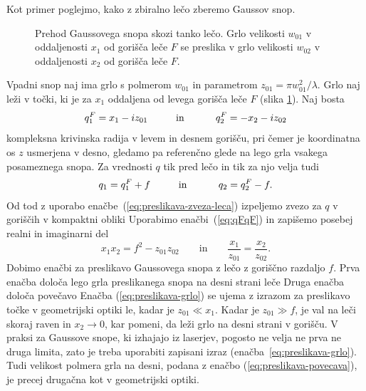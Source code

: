 Kot primer poglejmo, kako z zbiralno lečo zberemo Gaussov snop.
\begin{figure}[h]
\centering
\def\svgwidth{140truemm} 

\caption{Prehod Gaussovega snopa skozi
tanko lečo. Grlo velikosti $w_{01}$ v oddaljenosti $x_{1}$ od gorišča
leče $F$ se preslika v grlo velikosti $w_{02}$ v oddaljenosti $x_{2}$ od gorišča
leče $F$.}
\label{fig:Prehod-Gaussovega-snopa}
\end{figure}

Vpadni snop naj ima grlo s polmerom $w_{01}$ in parametrom $z_{01}=\pi w_{01}^2/\lambda$. 
Grlo naj leži v točki, ki je za $x_{1}$ oddaljena od levega gorišča leče $F$ (slika
\ref{fig:Prehod-Gaussovega-snopa}). Naj bosta 
\begin{equation}
q_{1}^{F}=x_{1}-iz_{01}\mbox{\hskip1cm in \hskip1cm}q_{2}^{F}=-x_{2}-iz_{02}
\label{eq:qFqF}
\end{equation}
 kompleksna krivinska radija v levem in desnem gorišču, pri čemer je koordinatna os $z$ 
 usmerjena v desno, gledamo pa referenčno glede na lego grla vsakega posameznega snopa. 
 Za vrednosti $q$ tik pred lečo in tik za njo velja tudi
\begin{equation}
q_{1}=q_{1}^{F}+f\mbox{\hskip1cm in \hskip1cm}q_{2}=q_{2}^{F}-f.
\end{equation}
 Od tod z uporabo enačbe~(\ref{eq:preslikava-zveza-leca}) izpeljemo zvezo
za $q$ v goriščih v kompaktni obliki 
Uporabimo enačbi~(\ref{eq:qFqF}) in 
zapišemo posebej realni in imaginarni del 
\begin{equation}
x_{1}x_{2}=f^{2}-z_{01}z_{02} \qquad \mathrm{in} \qquad
\frac{x_{1}}{z_{01}}=\frac{x_{2}}{z_{02}}.
\end{equation}
Dobimo enačbi za preslikavo Gaussovega snopa z lečo z goriščno razdaljo $f$.
Prva enačba določa lego grla preslikanega snopa na desni strani leče
Druga enačba določa povečavo
Enačba (\ref{eq:preslikava-grlo}) se ujema z izrazom za preslikavo točke v geometrijski
optiki le, kadar je $z_{01}\ll x_{1}$. Kadar je $z_{01}\gg f$, je
val na leči skoraj raven in $x_2 \to 0$, kar pomeni, da leži
grlo na desni strani v gorišču. V praksi za Gaussove snope, ki izhajajo iz laserjev, pogosto ne
velja ne prva ne druga limita, zato je treba uporabiti zapisani izraz 
(enačba~\ref{eq:preslikava-grlo}).
Tudi velikost polmera grla na desni, podana z enačbo (\ref{eq:preslikava-povecava}),
je precej drugačna kot v geometrijski optiki.

